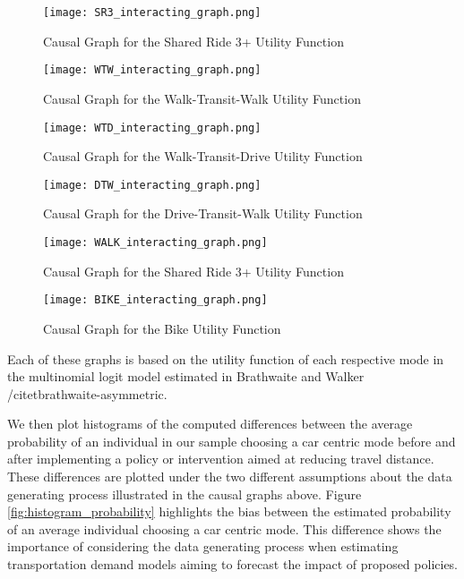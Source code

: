 \begin{figure}
   \centering
   \texttt{[image: SR3\_interacting\_graph.png]}
   \caption{Causal Graph for the Shared Ride 3+ Utility Function}
   \label{fig:SR3_causal_2}
\end{figure}

\begin{figure}
   \centering
   \texttt{[image: WTW\_interacting\_graph.png]}
   \caption{Causal Graph for the Walk-Transit-Walk Utility Function}
   \label{fig:WTW_causal_2}
\end{figure}

\begin{figure}
   \centering
   \texttt{[image: WTD\_interacting\_graph.png]}
   \caption{Causal Graph for the Walk-Transit-Drive Utility Function}
   \label{fig:WTD_causal_2}
\end{figure}

\begin{figure}
   \centering
   \texttt{[image: DTW\_interacting\_graph.png]}
   \caption{Causal Graph for the Drive-Transit-Walk Utility Function}
   \label{fig:DTW_causal_2}
\end{figure}

\begin{figure}
   \centering
   \texttt{[image: WALK\_interacting\_graph.png]}
   \caption{Causal Graph for the Shared Ride 3+ Utility Function}
   \label{fig:WALK_causal_2}
\end{figure}

\begin{figure}
   \centering
   \texttt{[image: BIKE\_interacting\_graph.png]}
   \caption{Causal Graph for the Bike Utility Function}
   \label{fig:BIKE_causal_2}
\end{figure}

Each of these graphs is based on the utility function of each respective mode in the multinomial logit model estimated in Brathwaite and Walker /citet{brathwaite-asymmetric}.

We then plot histograms of the computed differences between the average probability of an individual 
in our sample choosing a car centric mode before and after implementing a policy or intervention
aimed at reducing travel distance.
These differences are plotted under the two different assumptions about the data generating process illustrated in the causal graphs above.
Figure \ref{fig:histogram_probability} highlights the bias between the estimated probability of an average individual choosing a car centric mode.
This difference shows the importance of considering the data generating process when estimating transportation demand models aiming to forecast the impact of proposed policies.

